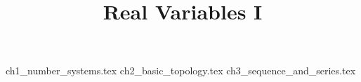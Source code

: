 \documentclass[]{report}
\title{Real Variables I}
\begin{document}
\maketitle
{ch1_number_systems.tex}
{ch2_basic_topology.tex}
{ch3_sequence_and_series.tex}
\end{document}
